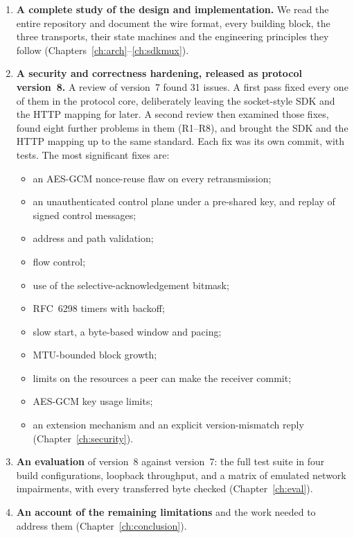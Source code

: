 \begin{enumerate}
  \item \textbf{A complete study of the design and implementation.} We read the entire repository and document
    the wire format, every building block, the three transports, their state machines and the engineering
    principles they follow (Chapters~\ref{ch:arch}--\ref{ch:sdkmux}).
  \item \textbf{A security and correctness hardening, released as protocol version~8.} A review of version~7
    found 31 issues. A first pass fixed every one of them in the protocol core, deliberately leaving the
    socket-style SDK and the HTTP mapping for later. A second review then examined those fixes, found eight
    further problems in them (R1--R8), and brought the SDK and the HTTP mapping up to the same standard. Each fix
    was its own commit, with tests. The most significant fixes are:
    \begin{itemize}
      \item an AES-GCM nonce-reuse flaw on every retransmission;
      \item an unauthenticated control plane under a pre-shared key, and replay of signed control messages;
      \item address and path validation;
      \item flow control;
      \item use of the selective-acknowledgement bitmask;
      \item RFC~6298 timers with backoff;
      \item slow start, a byte-based window and pacing;
      \item MTU-bounded block growth;
      \item limits on the resources a peer can make the receiver commit;
      \item AES-GCM key usage limits;
      \item an extension mechanism and an explicit version-mismatch reply (Chapter~\ref{ch:security}).
    \end{itemize}
  \item \textbf{An evaluation} of version~8 against version~7: the full test suite in four build
    configurations, loopback throughput, and a matrix of emulated network impairments, with every transferred
    byte checked (Chapter~\ref{ch:eval}).
  \item \textbf{An account of the remaining limitations} and the work needed to address them
    (Chapter~\ref{ch:conclusion}).
\end{enumerate}

